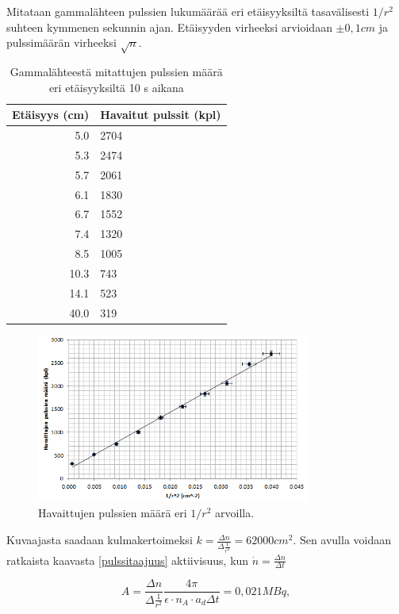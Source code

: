 \documentclass[a4paper,11pt]{article}
\begin{document}
Mitataan gammalähteen pulssien lukumäärää eri etäisyyksiltä tasavälisesti $1/r^2$ suhteen kymmenen sekunnin ajan. Etäisyyden virheeksi arvioidaan $\pm 0,1 cm$ ja pulssimäärän virheeksi $\sqrt{n}$.

\begin{table}[H]
\begin{center}
\caption{Gammalähteestä mitattujen pulssien määrä eri etäisyyksiltä 10 s aikana}
\begin{tabular}{ | r | l | }
  \hline
Etäisyys (cm) & Havaitut pulssit (kpl) \\ \hline
5.0 & 2704 \\ \hline
5.3 & 2474 \\ \hline
5.7 & 2061 \\ \hline
6.1 & 1830 \\ \hline
6.7 & 1552 \\ \hline
7.4 & 1320 \\ \hline
8.5 & 1005 \\ \hline
10.3 & 743 \\ \hline
14.1 & 523 \\ \hline
40.0 & 319 \\ \hline
\end{tabular}
\end{center}
\end{table}

\begin{figure}[H]
\centering \includegraphics[width=0.8\textwidth]{gamma1}
\caption{Havaittujen pulssien määrä eri $1/r^2$ arvoilla. \label{gamma1}}
\end{figure}

Kuvaajasta saadaan kulmakertoimeksi $k = \frac{\Delta{n}}{\Delta \frac{1}{r^2}} = 62 000 cm^2$. Sen avulla voidaan ratkaista kaavasta \ref{pulssitaajuus} aktiivisuus, kun $\dot{n} = \frac{\Delta n}{\Delta t}$ 

\begin{equation}
  A = \frac{\Delta n}{\Delta \frac{1}{r^2}} \frac{4 \pi }{\epsilon \cdot n_A \cdot a_d \Delta t} = 0,021 MBq ,
\end{equation}
\end{document}
